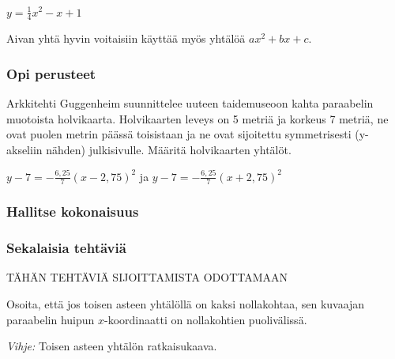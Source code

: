 \begin{esimerkki}
\begin{esimratk}
		\begin{esimvast}
			$y=\frac{1}{4}x^2 - x + 1$
			
			Aivan yhtä hyvin voitaisiin käyttää myös yhtälöä $ax^2 + bx +c$.
		\end{esimvast}


	\end{esimratk}
\end{esimerkki}




\begin{tehtavasivu}

\subsubsection*{Opi perusteet}

\begin{tehtava}
Arkkitehti Guggenheim suunnittelee uuteen taidemuseoon kahta paraabelin muotoista holvikaarta. Holvikaarten leveys on 5 metriä ja korkeus 7 metriä, ne ovat puolen metrin päässä toisistaan ja ne ovat sijoitettu symmetrisesti (y-akseliin nähden) julkisivulle. Määritä holvikaarten yhtälöt.
\begin{vastaus}
$y-7 = -\frac{6,25}{7}(x - 2,75)^2$ ja $y-7 = -\frac{6,25}{7}(x + 2,75)^2$
\end{vastaus}
\end{tehtava}



\subsubsection*{Hallitse kokonaisuus}

\subsubsection*{Sekalaisia tehtäviä}

TÄHÄN TEHTÄVIÄ SIJOITTAMISTA ODOTTAMAAN

\begin{tehtava}
Osoita, että jos toisen asteen yhtälöllä on kaksi nollakohtaa, sen kuvaajan paraabelin huipun $x$-koordinaatti on nollakohtien puolivälissä.
\begin{vastaus}
    \emph{Vihje:} Toisen asteen yhtälön ratkaisukaava.
\end{vastaus}
\end{tehtava}


\end{tehtavasivu}
